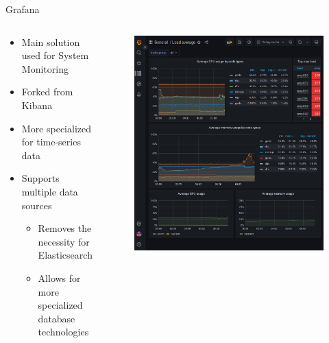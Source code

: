 \documentclass[compress,aspectratio=169]{beamer}
\begin{document}
\begin{frame}{Grafana}
\begin{columns}[T]
\begin{column}{0.5\textwidth}
\begin{itemize}
  \item Main solution used for System Monitoring
  \item Forked from Kibana
  \item More specialized for time-series data
  \item Supports multiple data sources
  \begin{itemize}
    \item Removes the necessity for Elasticsearch
    \item Allows for more specialized database technologies
  \end{itemize}
\end{itemize}
\end{column}
\begin{column}{0.5\textwidth}
\begin{figure}
  \includegraphics[height=.8\textheight]{example_grafana_dashboard.png}
\end{figure}
\end{column}
\end{columns}
\end{frame}
\end{document}
